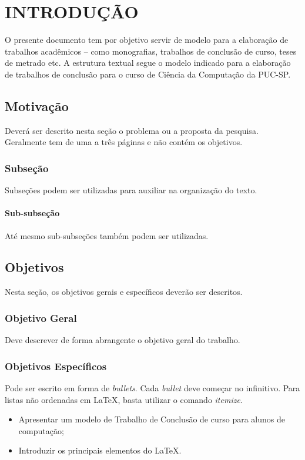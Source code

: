 \chapter{INTRODUÇÃO}
O presente documento tem por objetivo servir de modelo para a elaboração de trabalhos acadêmicos --  como monografias, trabalhos de conclusão de curso, teses de metrado etc. A estrutura textual segue o modelo indicado para a elaboração de trabalhos de conclusão para o curso de Ciência da Computação da PUC-SP. 

\section{Motivação}
Deverá ser descrito nesta seção o problema ou a proposta da pesquisa. Geralmente tem de uma a três páginas e não contém os objetivos.

\subsection{Subseção}
Subseções podem ser utilizadas para auxiliar na organização do texto.

\subsubsection{Sub-subseção}
Até mesmo sub-subseções também podem ser utilizadas.

\section{Objetivos}
Nesta seção, os objetivos gerais e específicos deverão ser descritos.

\subsection{Objetivo Geral}
Deve descrever de forma abrangente o objetivo geral do trabalho.

\subsection{Objetivos Específicos}
Pode ser escrito em forma de \emph{bullets}. Cada \emph{bullet} deve começar no infinitivo. Para listas não ordenadas em \LaTeX, basta utilizar o comando \emph{itemize}. 

\begin{itemize}
    \item Apresentar um modelo de Trabalho de Conclusão de curso para alunos de computação;
    \item Introduzir os principais elementos do \LaTeX.
\end{itemize}

